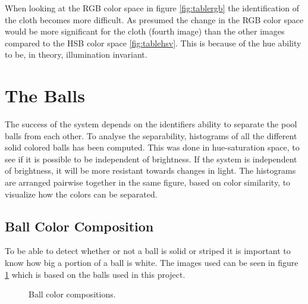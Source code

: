 When looking at the RGB color space in figure \ref{fig:tablergb} the identification of the cloth becomes more difficult. As presumed the change in the RGB color space would be more significant for the cloth (fourth image) than the other images compared to the HSB color space \ref{fig:tablehsv}. This is because of the hue ability to be, in theory, illumination invariant.

\section{The Balls}
\label{sec:analballs}
The success of the system depends on the identifiers ability to separate the pool balls from each other. To analyse the separability, histograms of all the different solid colored balls has been computed. This was done in hue-saturation space, to see if it is possible to be independent of brightness. If the system is independent of brightness, it will be more resistant towards changes in light. The histograms are arranged pairwise together in the same figure, based on color similarity, to visualize how the colors can be separated.



\subsection{Ball Color Composition}
To be able to detect whether or not a ball is solid or striped it is important to know how big a portion of a ball is white. The images used can be seen in figure \ref{fig:ballscompo} which is based on the balls used in this project.

\begin{figure}[htpb]
\centering
{}
\quad
{}
\quad
{}

\caption{Ball color compositions.}
\label{fig:ballscompo}
\end{figure}

